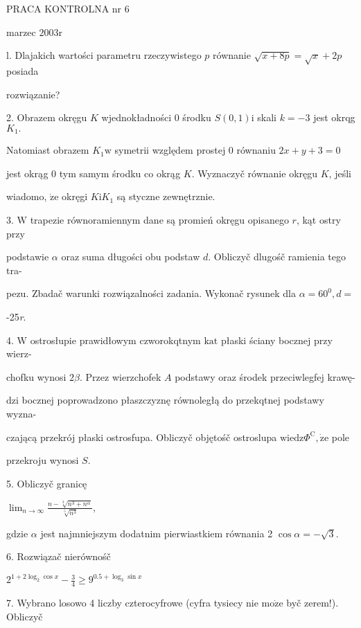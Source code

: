 \documentclass[a4paper,12pt]{article}
\begin{document}
PRACA KONTROLNA nr 6

marzec $2003\mathrm{r}$

l. Dlajakich wartości parametru rzeczywistego $p$ równanie $\sqrt{x+8p}=\sqrt{x}+2p$ posiada

rozwiązanie?

2. Obrazem okręgu $K$ wjednokładności $0$ środku $S(0,1)\mathrm{i}$ skali $k=-3$ jest okrqg $K_{1}.$

Natomiast obrazem $K_{1} \mathrm{w}$ symetrii względem prostej $0$ równaniu $2x+y+3 = 0$

jest okrąg $0$ tym samym środku co okrąg $K$. Wyznaczyč równanie okręgu $K$, jeśli

wiadomo, $\dot{\mathrm{z}}\mathrm{e}$ okręgi $K\mathrm{i}K_{1}$ są styczne zewnętrznie.

3. $\mathrm{W}$ trapezie równoramiennym dane są promień okręgu opisanego $r$, kąt ostry przy

podstawie $\alpha$ oraz suma długości obu podstaw $d$. Obliczyč dlugośč ramienia tego tra-

pezu. Zbadač warunki rozwiązalności zadania. Wykonač rysunek dla $\alpha=60^{0}, d=$

-25{\it r}.

4. $\mathrm{W}$ ostrosłupie prawidłowym czworokqtnym $\mathrm{k}\mathrm{a}\mathrm{t}$ płaski ściany bocznej przy wierz-

chofku wynosi $ 2\beta$. Przez wierzchofek $A$ podstawy oraz środek przeciwlegfej krawę-

dzi bocznej poprowadzono płaszczyznę równoległą do przekqtnej podstawy wyzna-

czającą przekrój płaski ostrosfupa. Obliczyč objętośč ostroslupa $\mathrm{w}\mathrm{i}\mathrm{e}\mathrm{d}\mathrm{z}\Phi^{\mathrm{C}}, \dot{\mathrm{z}}\mathrm{e}$ pole

przekroju wynosi $S.$

5. Obliczyč granicę

$\displaystyle \lim_{n\rightarrow\infty}\frac{n-\sqrt[3]{n^{3}+n^{\alpha}}}{\sqrt[5]{n^{3}}},$

gdzie $\alpha$ jest najmniejszym dodatnim pierwiastkiem równania 2 $\cos\alpha=-\sqrt{3}.$

6. Rozwiązač nierównośč

$2^{1+2\log_{2}\cos x}-\displaystyle \frac{3}{4}\geq 9^{0.5+\log_{3}\sin x}$

7. Wybrano losowo 4 liczby czterocyfrowe (cyfra tysiecy nie $\mathrm{m}\mathrm{o}\dot{\mathrm{z}}\mathrm{e}$ byč zerem!). Obliczyč
\end{document}
